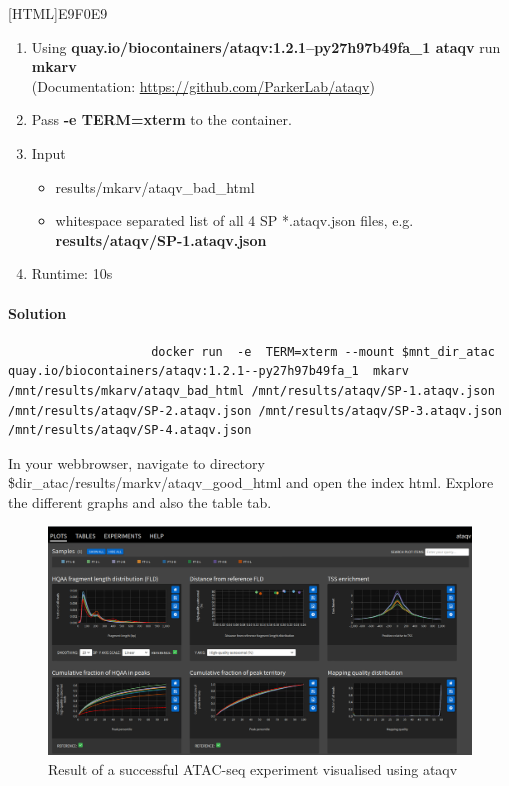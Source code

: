 \documentclass[12pt]{article}
\begin{document}
			[HTML]{E9F0E9}{\parbox{\linewidth}{%
					\begin{enumerate}
						\item  Using \textbf{quay.io/biocontainers/ataqv:1.2.1--py27h97b49fa\_1 ataqv} run \textbf{mkarv}\\
						(Documentation: \url{https://github.com/ParkerLab/ataqv})
						\item  Pass \textbf{-e TERM=xterm} to the container.
						\item Input
						\begin{itemize}
							\item results/mkarv/ataqv\_bad\_html 
							\item whitespace separated list of all 4 SP *.ataqv.json files, e.g.  \textbf{results/ataqv/SP-1.ataqv.json}  
						\end{itemize}
						\item Runtime: 10s
					\end{enumerate}
			}}
			
			\paragraph{Solution}	
			
			\begin{minipage}{\linewidth}
				\begin{lstlisting}
					docker run  -e  TERM=xterm --mount $mnt_dir_atac quay.io/biocontainers/ataqv:1.2.1--py27h97b49fa_1  mkarv /mnt/results/mkarv/ataqv_bad_html /mnt/results/ataqv/SP-1.ataqv.json /mnt/results/ataqv/SP-2.ataqv.json /mnt/results/ataqv/SP-3.ataqv.json /mnt/results/ataqv/SP-4.ataqv.json
				\end{lstlisting}
			\end{minipage}
			
			In your webbrowser, navigate to directory \$dir\_atac/results/markv/ataqv\_good\_html  and  open the index html. 
			Explore the different graphs and also the table tab.
			
			\begin{figure}[H]
				\includegraphics[width=\textwidth]{ataqv_good.png}
				\caption{Result of a successful  ATAC-seq experiment visualised using ataqv}
				\label{fig:ataqv_good}
			\end{figure}
			
\end{document}
